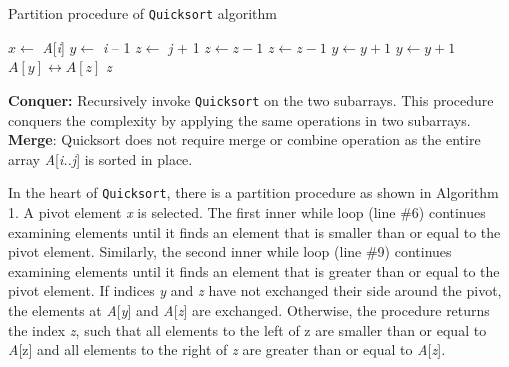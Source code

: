 \documentclass[a4paper, 10pt,twocolumn]{article}
\begin{document}
\begin{algorithm}
  \caption{ Partition procedure of \texttt{Quicksort} algorithm}
  \label{algo:quick_sort1}
  \begin{algorithmic}[1]
     \newline
      \newline
      \State $x \leftarrow$ \textit{A}[\textit{i}]
      \State $y \leftarrow$ \textit{i} -- 1
      \State $z \leftarrow$ \textit{j} + 1
          \State $z \leftarrow z - 1$
            \State $z \leftarrow z -1$
         \EndWhile
         \State $y \leftarrow y + 1$
            \State $y \leftarrow y + 1$
         \EndWhile
             $A[y] \leftrightarrow A[z]$
         \Else
             \textit{z}
         \EndIf
      \EndWhile
     \EndProcedure
  \end{algorithmic}
\end{algorithm}

\noindent\textbf{Conquer:} Recursively invoke \texttt{Quicksort} on the  two subarrays. This procedure conquers the complexity by applying the same operations in two subarrays.\\
\textbf{Merge}: Quicksort does not require merge or combine operation as the entire array \textit{A}[\textit{i..j}] is sorted in place.

In the heart of \texttt{Quicksort}, there is a partition procedure as shown in Algorithm 1. A pivot element \textit{x} is selected. The first inner while loop (line \#6) continues examining elements until it finds an element that is smaller than or equal to the pivot element. Similarly, the second inner while loop (line \#9) continues examining elements until it finds an element that is greater than or equal to the pivot element. If indices \textit{y} and \textit{z} have not exchanged their side around the pivot, the elements at \textit{A}[\textit{y}] and \textit{A}[\textit{z}] are exchanged. Otherwise, the procedure returns the index \textit{z}, such that all elements to the left of z are smaller than or equal to \textit{A}[z] and all elements to the right of \textit{z} are greater than or equal to \textit{A}[\textit{z}].
\end{document}
